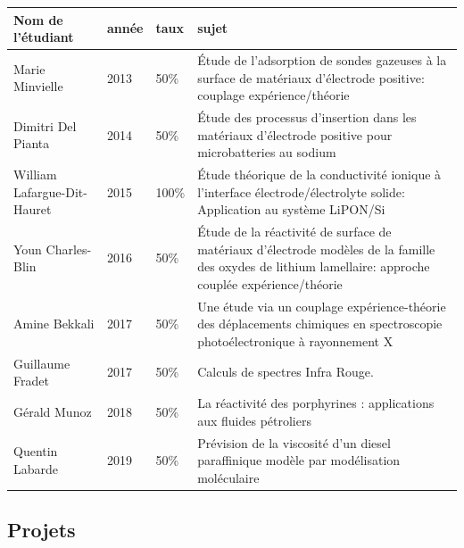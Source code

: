 \documentclass[11pt]{artuppax}
\newcounter{subsec}[section]
\begin{document}
{\singlespacing
\renewcommand{\arraystretch}{1.2}
\begin{tabularx}{\textwidth}{lllX}
\hline
Nom de l'étudiant & année & taux & sujet \\
\hline
Marie Minvielle & 2013 & 50\% & Étude de l'adsorption de sondes gazeuses à la surface de
                                matériaux d'électrode positive: couplage expérience/théorie \\
Dimitri Del Pianta & 2014 & 50\% & Étude des processus d'insertion dans les matériaux
                                   d'électrode positive pour microbatteries au sodium \\
William Lafargue-Dit-Hauret & 2015 & 100\% & Étude théorique de la conductivité ionique à
                                     l'interface
                                     électrode/électrolyte solide: Application au système
                                     LiPON/Si\\
Youn Charles-Blin & 2016 & 50\% & Étude de la réactivité de surface de matériaux d'électrode
                                  modèles de la famille des oxydes de lithium lamellaire:
                                  approche couplée expérience/théorie\\
Amine Bekkali & 2017 & 50\% & Une étude via un couplage expérience-théorie des déplacements
                              chimiques en spectroscopie photoélectronique à rayonnement X\\
Guillaume Fradet & 2017 & 50\% & Calculs de spectres Infra Rouge.\\
Gérald Munoz & 2018 & 50\% & La réactivité des porphyrines : applications aux fluides pétroliers\\
Quentin Labarde & 2019 & 50\% & Prévision de la viscosité d'un diesel paraffinique modèle par modélisation moléculaire\\
\hline
\end{tabularx}
}

%

\subsection{Projets}
\end{document}
